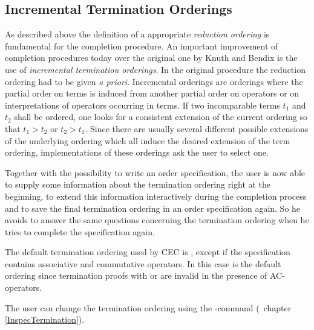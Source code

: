 \subsection{Incremental Termination Orderings}
\label{TerminationOrderings}

As described above the definition of a appropriate {\em reduction ordering} is 
fundamental for the completion procedure.
An important improvement of completion procedures today over the original one
by Knuth and Bendix 
\cite{KB69} is the use of {\it incremental termination orderings}. 
In the original procedure the reduction ordering had to be given
{\it a priori}. Incremental orderings are orderings where the partial order on terms
is induced from another partial order on operators or on interpretations of operators
occurring in terms. If two incomparable terms $t_1$ and $t_2$ shall be ordered,
one looks for a consistent extension of the current ordering so that
$t_1  > t_2 $ or $t_2  > t_1 $. Since there are
usually several different possible extensions of the underlying ordering which all
induce the desired extension of the term ordering, implementations of these orderings
ask the user to select one.

Together with the possibility to write an order specification, the user is now
able to supply some information about the termination ordering right at the
beginning, to extend this information interactively during the completion process
and to save the final termination ordering in an order specification again.
So he avoids to answer the same questions concerning the termination ordering 
when he tries to complete the specification again.

The default termination ordering used by CEC is , except if the specification
contains associative and commutative operators. In this case  is the
default ordering since termination proofs with  or  
are invalid in the presence of AC-operators. 

The user can change the termination ordering using the 
-command (\ chapter \ref{InspecTermination}).

%
%
%
%
%
%
%
%

